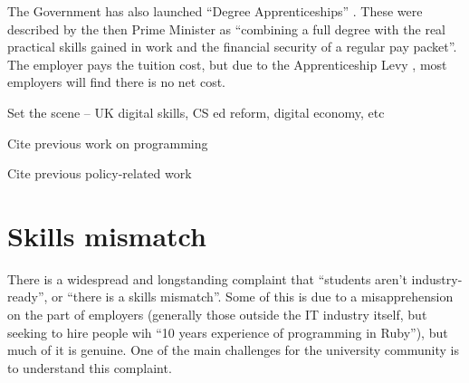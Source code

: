 \documentclass[sigconf]{acmart}
\begin{document}
The Government has also launched ``Degree Apprenticeships'' \cite{BIS2015a}. These were described by the then Prime Minister as ``combining a full degree with the real practical skills gained in work and the financial security of a regular pay packet''. The employer pays the tuition cost, but due to the Apprenticeship Levy \cite{HMRC2016a}, most employers will find there is no net cost.

Set the scene -- UK digital skills, CS ed reform, digital economy, etc

Cite previous work on programming~\cite{davenport-et-al:latice2016,murphy-et-al:programming2017,simon-et-al:sigcse2018}

Cite previous policy-related work~\cite{crick+sentance:2011,brown-et-al-sigcse2013,brown-et-al-toce2014,crick+moller-wipsce2015}

\section{Skills mismatch}
There is a widespread and longstanding complaint that ``students aren't industry-ready'', or ``there is a skills mismatch''. Some of this is due to a misapprehension on the part of employers (generally those outside the IT industry itself, but seeking to hire people wih ``10 years experience of programming in Ruby''), but much of it is genuine. One of the main challenges for the university community is to understand this complaint.
\end{document}
